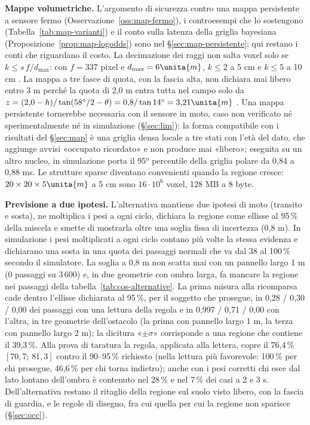 \textbf{Mappe volumetriche.} L'argomento di sicurezza contro una mappa persistente a sensore fermo (Osservazione~\ref{oss:map-fermo}), i controesempi che lo sostengono (Tabella~\ref{tab:map-varianti}) e il conto sulla latenza della griglia bayesiana (Proposizione~\ref{prop:map-logodds}) sono nel \S\ref{sec:map-persistente}; qui restano i conti che riguardano il costo. La decimazione dei raggi non salta voxel solo se $k\le s\,f/d_{\max}$: con $f=337$ pixel e $d_{\max}=6\unita{m}$, $k\le2$ a 5 cm e $k\le5$ a 10 cm . La mappa a tre fasce di quota, con la fascia alta, non dichiara mai libero entro 3 m perché la quota di 2,0 m entra tutta nel campo solo da $z=(2{,}0-h)/\tan(58^\circ/2-\theta)=0{,}8/\tan14^\circ=3{,}21\unita{m}$ . Una mappa persistente tornerebbe necessaria con il sensore in moto, caso non verificato né sperimentalmente né in simulazione (\S\ref{sec:lim}): la forma compatibile con i risultati del \S\ref{sec:map} è una griglia densa locale a tre stati con l'età del dato, che aggiunge avvisi «occupato ricordato» e non produce mai «libero»; eseguita su un altro nucleo, in simulazione porta il 95° percentile della griglia polare da 0,84 a 0,88 ms. Le strutture sparse diventano convenienti quando la regione cresce: $20\times20\times5\unita{m}$ a 5 cm sono $16\cdot10^6$ voxel, 128 MB a 8 byte.

\textbf{Previsione a due ipotesi.} L'alternativa mantiene due ipotesi di moto (transito e sosta), ne moltiplica i pesi a ogni ciclo, dichiara la regione come ellisse al 95\,\% della miscela e smette di mostrarla oltre una soglia fissa di incertezza (0,8 m). In simulazione i pesi moltiplicati a ogni ciclo contano più volte la stessa evidenza e dichiarano una sosta in una quota dei passaggi normali che va dal 38 al 100\,\% secondo il simulatore. La soglia a 0,8 m non scatta mai con un pannello largo 1 m (0 passaggi su $3\,600$) e, in due geometrie con ombra larga, fa mancare la regione nei passaggi della tabella~\ref{tab:cos-alternative}. La prima misura alla ricomparsa cade dentro l'ellisse dichiarata al 95\,\%, per il soggetto che prosegue, in 0,28 / 0,30 / 0,00 dei passaggi con una lettura della regola e in 0,997 / 0,71 / 0,00 con l'altra, in tre geometrie dell'ostacolo (la prima con pannello largo 1 m, la terza con pannello largo 2 m); la dicitura «$\pm\sigma$» corrisponde a una regione che contiene il 39,3\,\%. Alla prova di taratura la regola, applicata alla lettera, copre il 76,4\,\% $[70{,}7;\,81{,}3]$ contro il 90--95\,\% richiesto (nella lettura più favorevole: 100\,\% per chi prosegue, 46,6\,\% per chi torna indietro); anche con i pesi corretti chi esce dal lato lontano dell'ombra è contenuto nel 28\,\% e nel 7\,\% dei casi a 2 e 3 s. Dell'alternativa restano il ritaglio della regione sul suolo visto libero, con la fascia di guardia, e le regole di disegno, fra cui quella per cui la regione non sparisce (\S\ref{sec:occ}). 

